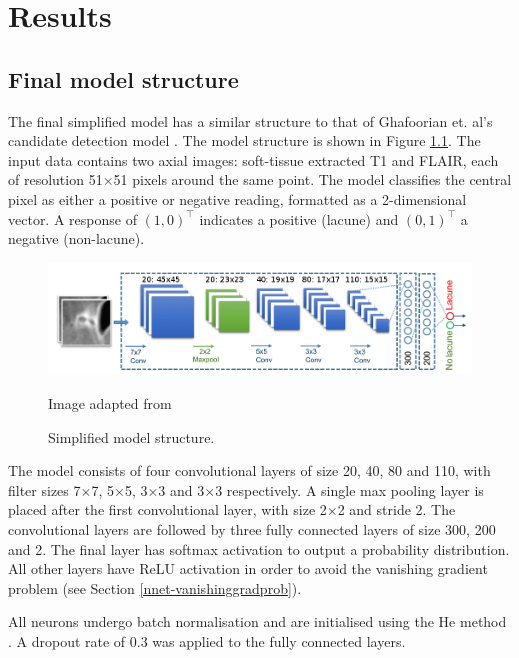 


\chapter{Results}\label{results}

\section{Final model structure}

The final simplified model has a similar structure to that of Ghafoorian et. al's candidate detection model \cite{GhafoorianM.2017Dml3}. The model structure is shown in Figure \ref{results-model-fig}. The input data contains two axial images: soft-tissue extracted T1 and FLAIR, each of resolution 51$\times$51 pixels around the same point. The model classifies the central pixel as either a positive or negative reading, formatted as a 2-dimensional vector. A response of $(1,0)^\intercal$ indicates a positive (lacune) and $(0,1)^\intercal$ a negative (non-lacune).

\begin{figure}[ht]
	\centering
	\includegraphics[width=\textwidth]{Images/7_simplified_model.png}
	\caption{Simplified model structure.}
	\small Image adapted from \cite{GhafoorianM.2017Dml3}
	\label{results-model-fig}
\end{figure}

The model consists of four convolutional layers of size 20, 40, 80 and 110, with filter sizes 7$\times$7, 5$\times$5, 3$\times$3 and 3$\times$3 respectively. A single max pooling layer is placed after the first convolutional layer, with size 2$\times$2 and stride 2. The convolutional layers are followed by three fully connected layers of size 300, 200 and 2. The final layer has softmax activation to output a probability distribution. All other layers have ReLU activation in order to avoid the vanishing gradient problem (see Section \ref{nnet-vanishinggradprob}).

All neurons undergo batch normalisation and are initialised using the He method \cite{HeK2016Drlf}. A dropout rate of 0.3 was applied to the fully connected layers.

